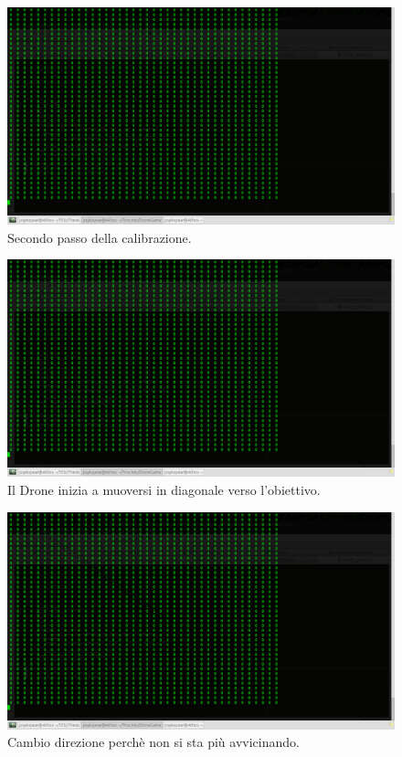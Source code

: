 \begin{figure}[hb]
\center
\includegraphics[width=\textwidth]{immagini/Run4.png}
\caption{Secondo passo della calibrazione.}
\end{figure}

\begin{figure}[hb]
\center
\includegraphics[width=\textwidth]{immagini/Run5.png}
\caption{Il Drone inizia a muoversi in diagonale verso l'obiettivo.}
\end{figure}

\begin{figure}[hb]
\center
\includegraphics[width=\textwidth]{immagini/Run6.png}
\caption{Cambio direzione perchè non si sta più avvicinando.}
\end{figure}

